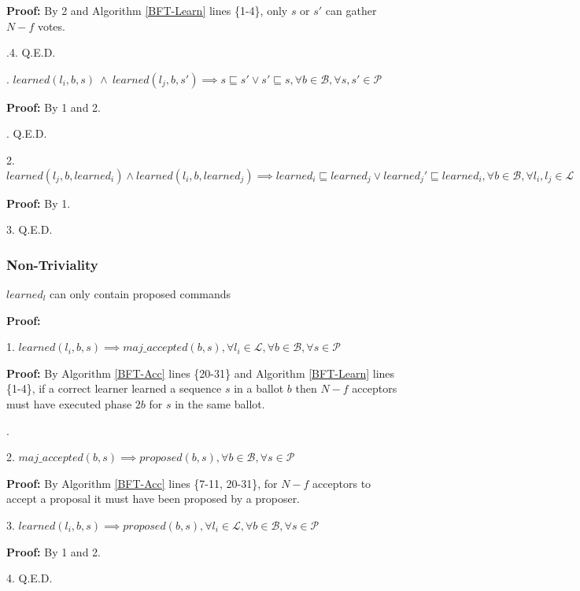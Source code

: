 \indent\indent\indent\indent\indent\indent \parbox{\linewidth}{\textbf{Proof:} By 2 and Algorithm \ref{BFT-Learn} lines \{1-4\}, only $s$ or $s'$ can gather $N-f$ votes.}\par
\indent\indent\indent\indent{}.4. Q.E.D. \par
\indent\indent{}. $learned(l_i,b,s)\ \land\ learned(l_j,b,s') \implies s \sqsubseteq s' \lor s' \sqsubseteq s, \forall b \in \mathcal{B}, \forall s,s' \in \mathcal{P}$ \par
\indent\indent\indent\indent\textbf{Proof:} By 1 and 2.\par
\indent\indent{}. Q.E.D. \par
\parbox{\linewidth}{2. $learned(l_j,b,learned_i) \land learned(l_i,b,learned_j) \implies learned_i \sqsubseteq learned_j \lor learned_j' \sqsubseteq learned_i, \forall b \in \mathcal{B}, \forall l_i,l_j \in \mathcal{L}$}\par
\indent\indent\textbf{Proof:} By 1.\par
3. Q.E.D. \par

\subsubsection{Non-Triviality}
\begin{theorem}
$learned_l$ can only contain proposed commands \label{N-T1} \par
\end{theorem} 
\textbf{Proof:} \par
1. $learned(l_i,b,s) \implies maj\_accepted(b,s),\forall l_i \in \mathcal{L}, \forall b \in \mathcal{B}, \forall s \in \mathcal{P}$ \par
\indent\indent\parbox{\linewidth}{\textbf{Proof:} By Algorithm \ref{BFT-Acc} lines \{20-31\} and Algorithm \ref{BFT-Learn} lines \{1-4\}, if a correct learner learned a sequence $s$ in a ballot $b$ then $N-f$ acceptors must have executed phase $2b$ for $s$ in the same ballot.}. \par
2. $maj\_accepted(b,s) \implies proposed(b,s),\forall b \in \mathcal{B}, \forall s \in \mathcal{P}$ \par
\indent\indent\textbf{Proof:} By Algorithm \ref{BFT-Acc} lines \{7-11, 20-31\}, for $N-f$ acceptors to accept a proposal it must have been proposed by a proposer.\par
3. $learned(l_i,b,s) \implies proposed(b,s),\forall l_i \in \mathcal{L}, \forall b \in \mathcal{B}, \forall s \in \mathcal{P}$ \par
\indent\indent\textbf{Proof:} By 1 and 2. \par
4. Q.E.D. \par


